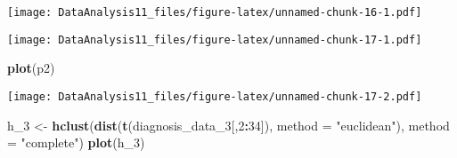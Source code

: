 \documentclass[]{article}
\newenvironment{Shaded}{\begin{snugshade}}{\end{snugshade}}
\newcommand{\KeywordTok}[1]{\textcolor[rgb]{0.13,0.29,0.53}{\textbf{#1}}}
\newcommand{\DataTypeTok}[1]{\textcolor[rgb]{0.13,0.29,0.53}{#1}}
\newcommand{\DecValTok}[1]{\textcolor[rgb]{0.00,0.00,0.81}{#1}}
\newcommand{\StringTok}[1]{\textcolor[rgb]{0.31,0.60,0.02}{#1}}
\newcommand{\OtherTok}[1]{\textcolor[rgb]{0.56,0.35,0.01}{#1}}
\newcommand{\OperatorTok}[1]{\textcolor[rgb]{0.81,0.36,0.00}{\textbf{#1}}}
\newcommand{\NormalTok}[1]{#1}
\begin{document}
\texttt{[image: DataAnalysis11\_files/figure-latex/unnamed-chunk-16-1.pdf]}

\begin{Shaded}
\end{Shaded}

\texttt{[image: DataAnalysis11\_files/figure-latex/unnamed-chunk-17-1.pdf]}

\begin{Shaded}
\begin{Highlighting}[]
\KeywordTok{plot}\NormalTok{(p2)}
\end{Highlighting}
\end{Shaded}

\texttt{[image: DataAnalysis11\_files/figure-latex/unnamed-chunk-17-2.pdf]}

\begin{Shaded}
\begin{Highlighting}[]
\NormalTok{h_}\DecValTok{3}\NormalTok{ <-}\StringTok{ }\KeywordTok{hclust}\NormalTok{(}\KeywordTok{dist}\NormalTok{(}\KeywordTok{t}\NormalTok{(diagnosis_data_}\DecValTok{3}\NormalTok{[,}\DecValTok{2}\OperatorTok{:}\DecValTok{34}\NormalTok{]), }\DataTypeTok{method =} \StringTok{"euclidean"}\NormalTok{), }\DataTypeTok{method =} \StringTok{"complete"}\NormalTok{)}
\KeywordTok{plot}\NormalTok{(h_}\DecValTok{3}\NormalTok{)}
\end{Highlighting}
\end{Shaded}
\end{document}
